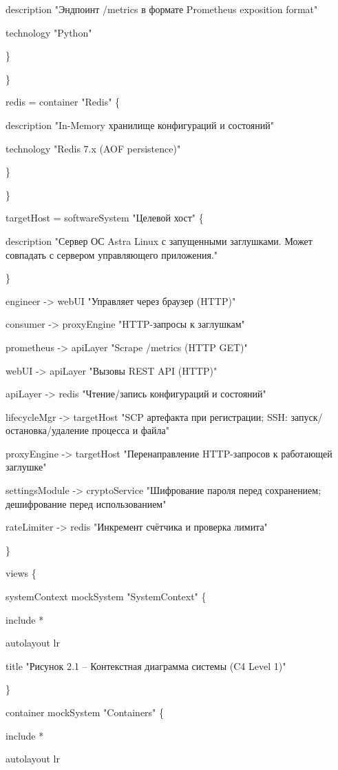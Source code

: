 \documentclass[
]{article}
\begin{document}
description "Эндпоинт /metrics в формате Prometheus exposition format"

technology "Python"

\}

\}

redis = container "Redis" \{

description "In-Memory хранилище конфигураций и состояний"

technology "Redis 7.x (AOF persistence)"

\}

\}

targetHost = softwareSystem "Целевой хост" \{

description "Сервер ОС Astra Linux с запущенными заглушками. Может
совпадать с сервером управляющего приложения."

\}

engineer -\textgreater{} webUI "Управляет через браузер (HTTP)"

consumer -\textgreater{} proxyEngine "HTTP-запросы к заглушкам"

prometheus -\textgreater{} apiLayer "Scrape /metrics (HTTP GET)"

webUI -\textgreater{} apiLayer "Вызовы REST API (HTTP)"

apiLayer -\textgreater{} redis "Чтение/запись конфигураций и состояний"

lifecycleMgr -\textgreater{} targetHost "SCP артефакта при регистрации;
SSH: запуск/остановка/удаление процесса и файла"

proxyEngine -\textgreater{} targetHost "Перенаправление HTTP-запросов к
работающей заглушке"

settingsModule -\textgreater{} cryptoService "Шифрование пароля перед
сохранением; дешифрование перед использованием"

rateLimiter -\textgreater{} redis "Инкремент счётчика и проверка лимита"

\}

views \{

systemContext mockSystem "SystemContext" \{

include *

autolayout lr

title "Рисунок 2.1 -- Контекстная диаграмма системы (C4 Level 1)"

\}

container mockSystem "Containers" \{

include *

autolayout lr
\end{document}
